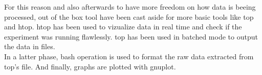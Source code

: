 For this reason and also afterwards to have more freedom on how data is beeing
processed, out of the box tool have been cast aside for more basic tools like top 
and htop. htop has been used to vizualize data in real time and check if the 
experiment was running flawlessly. top has been used in batched mode to output
the data in files.\\ 

In a latter phase, bash operation is used to format the raw data extracted from 
top's file. And finally, graphs are plotted with gnuplot.\\


